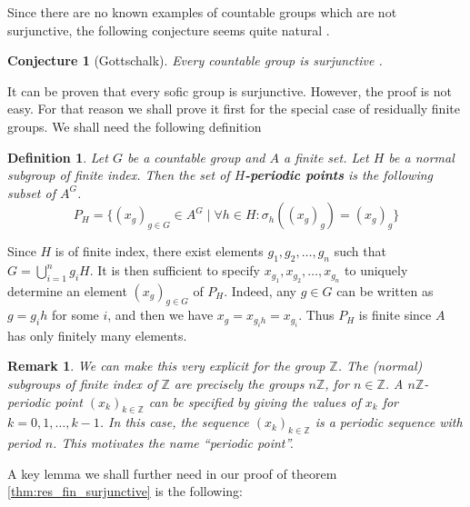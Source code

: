 \documentclass[titlepage, a4paper]{article}
\newcommand{\Z}{\mathbb{Z}}
\theoremstyle{theoremdd}
\newtheorem{conjecture}[theorem]{Conjecture}
\theoremstyle{definitiondd}
\newtheorem{definition}[theorem]{Definition}
\theoremstyle{remarkdd}
\newtheorem{remark}[theorem]{Remark}
\begin{document}
Since there are no known examples of countable groups which are not surjunctive, the following conjecture seems quite natural \cite[introduction]{weiss_2000}.

    \begin{conjecture}[Gottschalk] \label{conj:gottschalk}
        Every countable group is surjunctive  .
    \end{conjecture}

    It can be proven that every sofic group is surjunctive. However, the proof is not easy. For that reason we shall prove it first for the special case of residually finite groups. We shall need the following definition
\begin{definition}
    Let $G$ be a countable group and $A$ a finite set. Let $H$ be a normal subgroup of finite index. Then the set of \textbf{$H$-periodic points} is the following subset of $A^G$.
        \[
        P_H = \{ (x_g)_{g \in G} \in A^G  \mid \forall h \in H: \sigma_h((x_g)_g) = (x_g)_g\}
        \]
\end{definition}


Since $H$ is of finite index, there exist elements $g_1, g_2, \dots, g_n$ such that $G = \bigcup_{i=1}^n g_i H$. It is then sufficient to specify $x_{g_1}, x_{g_2}, \dots, x_{g_n}$ to uniquely determine an element $(x_g)_{g \in G}$ of $P_H$. Indeed, any $g \in G$ can be written as $g = g_ih$ for some $i$, and then we have $x_g = x_{g_ih} = x_{g_i}$. Thus $P_H$ is finite since $A$ has only finitely many elements.

\begin{remark}
We can make this very explicit for the group $\Z$. The (normal) subgroups of finite index of $\Z$ are precisely the groups $n\Z$, for $n \in \Z$. A $n\Z$-periodic point $(x_k)_{k \in \Z}$ can be specified by giving the values of $x_k$ for $k=0, 1, \dots, k-1$. In this case, the sequence 
$(x_k)_{k \in \Z}$ is a periodic sequence with period $n$. This motivates the name ``periodic point''.
\end{remark}

A key lemma we shall further need in our proof of theorem \ref{thm:res_fin_surjunctive} is the following:
\end{document}
